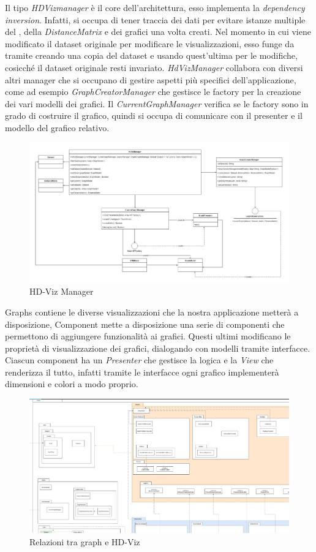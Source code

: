 \documentclass[../manuale_sviluppatore.tex]{subfiles}
\begin{document}
Il tipo \emph{HDVizmanager} è il core dell'architettura, esso implementa la \emph{dependency inversion}.
Infatti, si occupa di tener traccia dei dati per evitare istanze multiple del , 
della \emph{DistanceMatrix} e dei grafici una volta creati. 
Nel momento in cui viene modificato il dataset originale per modificare le visualizzazioni, esso 
funge da tramite creando una copia del dataset e usando quest'ultima per le modifiche, cosicché il 
dataset originale resti invariato.
\emph{HdVizManager} collabora con diversi altri manager che si occupano di gestire aspetti più 
specifici dell'applicazione, come ad esempio \emph{GraphCreatorManager} che gestisce le factory
per la creazione dei vari modelli dei grafici. 
Il \emph{CurrentGraphManager} verifica se le factory sono in grado di costruire il grafico, 
quindi si occupa di comunicare con il presenter e il modello del grafico relativo.


\begin{figure}[H]
	\centering
	\includegraphics[width=18cm]{src/img/core-hdvizmanager.jpg}
	\caption{HD-Viz Manager}
\end{figure}

Graphs contiene le diverse visualizzazioni che la nostra applicazione metterà a disposizione, Component mette a disposizione una serie di componenti che permettono di aggiungere funzionalità ai grafici.
Questi ultimi modificano le proprietà di visualizzazione dei grafici, dialogando con modelli tramite interfacce. Ciascun component ha un \emph{Presenter} che gestisce la logica e la \emph{View} che renderizza il tutto,
infatti tramite le interfacce ogni grafico implementerà dimensioni e colori a modo proprio.

\begin{figure}[H]
	\centering
	\includegraphics[width=18cm]{src/img/graph-e-hdviz.jpg}
	\caption{Relazioni tra graph e HD-Viz}
\end{figure}
\end{document}
